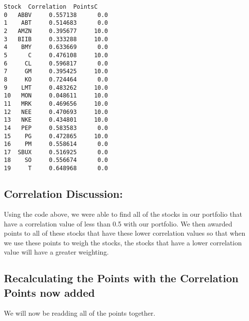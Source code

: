 \documentclass[11pt]{article}
\makeatletter
\newcommand{\boxspacing}{\kern\kvtcb@left@rule\kern\kvtcb@boxsep}
\newcommand{\prompt}[4]{
        {\ttfamily\llap{{\color{#2}[#3]:\hspace{3pt}#4}}\vspace{-\baselineskip}}
    }
\makeatother
\begin{document}
            \begin{tcolorbox}[breakable, size=fbox, boxrule=.5pt, pad at break*=1mm, opacityfill=0]
\prompt{Out}{outcolor}{33}{\boxspacing}
\begin{Verbatim}[commandchars=\\\{\}]
   Stock  Correlation  PointsC
0   ABBV     0.557138      0.0
1    ABT     0.514683      0.0
2   AMZN     0.395677     10.0
3   BIIB     0.333288     10.0
4    BMY     0.633669      0.0
5      C     0.476108     10.0
6     CL     0.596817      0.0
7     GM     0.395425     10.0
8     KO     0.724464      0.0
9    LMT     0.483262     10.0
10   MON     0.048611     10.0
11   MRK     0.469656     10.0
12   NEE     0.470693     10.0
13   NKE     0.434801     10.0
14   PEP     0.583583      0.0
15    PG     0.472865     10.0
16    PM     0.558614      0.0
17  SBUX     0.516925      0.0
18    SO     0.556674      0.0
19     T     0.648968      0.0
\end{Verbatim}
\end{tcolorbox}
        
    \hypertarget{correlation-discussion}{%
\subsection{Correlation Discussion:}\label{correlation-discussion}}

Using the code above, we were able to find all of the stocks in our
portfolio that have a correlation value of less than 0.5 with our
portfolio. We then awarded points to all of these stocks that have these
lower correlation values so that when we use these points to weigh the
stocks, the stocks that have a lower correlation value will have a
greater weighting.

    \hypertarget{recalculating-the-points-with-the-correlation-points-now-added}{%
\subsection{Recalculating the Points with the Correlation Points now
added}\label{recalculating-the-points-with-the-correlation-points-now-added}}

    We will now be readding all of the points together.
\end{document}
